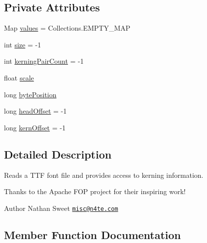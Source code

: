 \subsection*{Private Attributes}
\begin{DoxyCompactItemize}
\item 
Map \mbox{\hyperlink{classorg_1_1newdawn_1_1slick_1_1tools_1_1hiero_1_1_kerning_a2fb8954e8eb2c071e18a4e14b19ce352}{values}} = Collections.\+E\+M\+P\+T\+Y\+\_\+\+M\+AP
\item 
int \mbox{\hyperlink{classorg_1_1newdawn_1_1slick_1_1tools_1_1hiero_1_1_kerning_ac5fb2c0fbb7c6ff5bb74545713f197d5}{size}} = -\/1
\item 
int \mbox{\hyperlink{classorg_1_1newdawn_1_1slick_1_1tools_1_1hiero_1_1_kerning_a5d054877d909331426a9195b9ce1d133}{kerning\+Pair\+Count}} = -\/1
\item 
float \mbox{\hyperlink{classorg_1_1newdawn_1_1slick_1_1tools_1_1hiero_1_1_kerning_a3738309c9d9966c1fee3a5694404b87e}{scale}}
\item 
long \mbox{\hyperlink{classorg_1_1newdawn_1_1slick_1_1tools_1_1hiero_1_1_kerning_a6c58cfffdf2d5619a257504e489deb1b}{byte\+Position}}
\item 
long \mbox{\hyperlink{classorg_1_1newdawn_1_1slick_1_1tools_1_1hiero_1_1_kerning_a62f4639c6dfb62dbec439d7abf53f20c}{head\+Offset}} = -\/1
\item 
long \mbox{\hyperlink{classorg_1_1newdawn_1_1slick_1_1tools_1_1hiero_1_1_kerning_a382489aa078253e87f23dc0be2ebd299}{kern\+Offset}} = -\/1
\end{DoxyCompactItemize}


\subsection{Detailed Description}
Reads a T\+TF font file and provides access to kerning information.

Thanks to the Apache F\+OP project for their inspiring work!

\begin{DoxyAuthor}{Author}
Nathan Sweet \href{mailto:misc@n4te.com}{\tt misc@n4te.\+com} 
\end{DoxyAuthor}


\subsection{Member Function Documentation}
\mbox{\label{classorg_1_1newdawn_1_1slick_1_1tools_1_1hiero_1_1_kerning_a4b370fa79f600d979db8ea2ee77abbf1}} 
